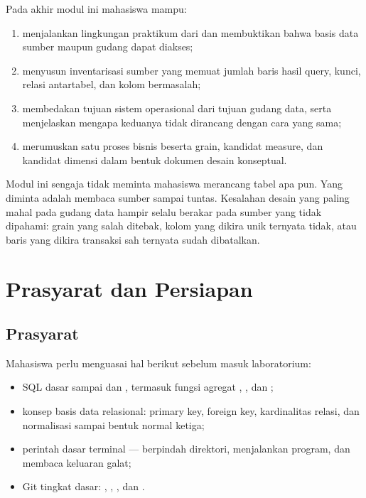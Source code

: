\begin{capaian}
Pada akhir modul ini mahasiswa mampu:
\begin{enumerate}[leftmargin=1.4em]
  \item menjalankan lingkungan praktikum dari  dan
        membuktikan bahwa basis data sumber maupun gudang dapat diakses;
  \item menyusun inventarisasi sumber yang memuat jumlah baris hasil query,
        kunci, relasi antartabel, dan kolom bermasalah;
  \item membedakan tujuan sistem operasional dari tujuan gudang data, serta
        menjelaskan mengapa keduanya tidak dirancang dengan cara yang sama;
  \item merumuskan satu proses bisnis beserta grain, kandidat measure, dan
        kandidat dimensi dalam bentuk dokumen desain konseptual.
\end{enumerate}
\end{capaian}

Modul ini sengaja tidak meminta mahasiswa merancang tabel apa pun. Yang diminta
adalah membaca sumber sampai tuntas. Kesalahan desain yang paling mahal pada
gudang data hampir selalu berakar pada sumber yang tidak dipahami: grain yang
salah ditebak, kolom yang dikira unik ternyata tidak, atau baris yang dikira
transaksi sah ternyata sudah dibatalkan.

\section{Prasyarat dan Persiapan}

\subsection{Prasyarat}

Mahasiswa perlu menguasai hal berikut sebelum masuk laboratorium:

\begin{itemize}
  \item SQL dasar sampai  dan , termasuk
        fungsi agregat , , dan
        ;
  \item konsep basis data relasional: primary key, foreign key, kardinalitas
        relasi, dan normalisasi sampai bentuk normal ketiga;
  \item perintah dasar terminal --- berpindah direktori, menjalankan program,
        dan membaca keluaran galat;
  \item Git tingkat dasar: , , ,
        dan .
\end{itemize}

